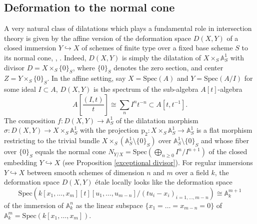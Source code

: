 \documentclass[10pt]{alggeom}
\renewcommand{\geq}{\geqslant}
\theoremstyle{definition}
\numberwithin{equation}{section}
\begin{document}
\subsection{Deformation to the normal cone}

A very natural class of dilatations which plays a fundamental role
in intersection theory is given by the affine version of the deformation
space $D(X,Y)$ of a closed immersion $Y\hookrightarrow X$ of schemes
of finite type over a fixed base scheme $S$ to its normal cone, \cite{Ful98},
\cite[\S 10]{Ro96}. Indeed, $D(X,Y)$ is simply the dilatation of
$X\times_{S}\mathbb{A}_{S}^{1}$ with divisor $D=X\times_{S}\{0\}_{S}$,
where $\{0\}_{S}$ denotes the zero section, and center $Z=Y\times_{S}\{0\}_S$.
In the affine setting, say $X=\mathrm{Spec}(A)$ and $Y=\mathrm{Spec}(A/I)$
for some ideal $I\subset A$, $D(X,Y)$ is the spectrum of the sub-algebra
$A[t]$-algebra
\[
A[\frac{(I,t)}{t}]\cong\sum_{n}I^{n}t^{-n}\subset A[t,t^{-1}].
\]
The composition $f:D(X,Y)\to\mathbb{A}_{S}^{1}$ of the dilatation
morphism $\sigma:D(X,Y)\to X\times_{S}\mathbb{A}_{S}^{1}$ with the
projection $\mathrm{p}_{2}:X\times_{S}\mathbb{A}_{S}^{1}\to\mathbb{A}_{S}^{1}$
is a flat morphism restricting to the trivial bundle $X\times_{S}(\mathbb{A}_{S}^{1}\setminus\{0\}_{S})$
over $\mathbb{A}_{S}^{1}\setminus\{0\}_{S}$ and whose fiber over
$\{0\}_{S}$ equals the normal cone $N_{Y/X}=\mathrm{Spec}(\bigoplus_{n\geq0}I^{n}/I^{n+1})$
of the closed embedding $Y\hookrightarrow X$ (see Proposition \ref{exceptional divisor}).
For regular immersions $Y\hookrightarrow X$ between smooth schemes
of dimension $n$ and $m$ over a field $k$, the deformation space
$D(X,Y)$ \'etale locally looks like the deformation space 
\[
\mathrm{Spec}(k[x_{1},\ldots,x_{m}][t][u_{1},\ldots,u_{m-n}]/(tu_{i}-x_{i})_{i=1,\ldots,m-n})\cong\mathbb{A}_{k}^{m+1}
\]
of the immersion of $\mathbb{A}_{k}^{n}$ as the linear subspace $\{x_{1}=\ldots=x_{m-n}=0\}$
of $\mathbb{A}_{k}^{m}=\mathrm{Spec}(k[x_{1},\ldots,x_{m}])$.\\
\end{document}
